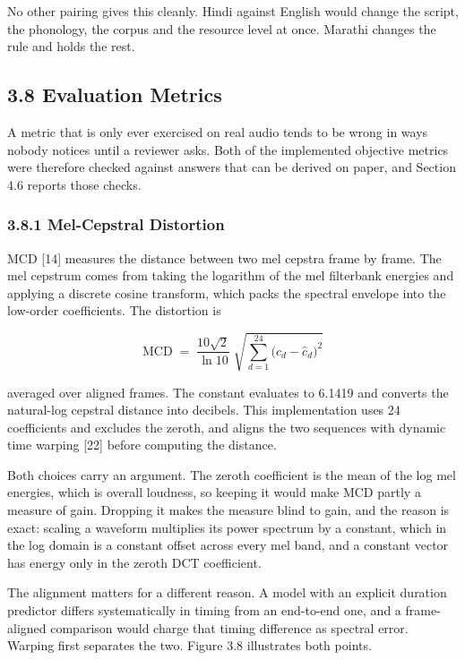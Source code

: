 \documentclass[12pt,a4paper]{article}
\begin{document}
No other pairing gives this cleanly. Hindi against English would change the script, the phonology, the corpus and the resource level at once. Marathi changes the rule and holds the rest.

\subsection*{3.8  Evaluation Metrics}
A metric that is only ever exercised on real audio tends to be wrong in ways nobody notices until a reviewer asks. Both of the implemented objective metrics were therefore checked against answers that can be derived on paper, and Section 4.6 reports those checks.

\subsubsection*{3.8.1  Mel-Cepstral Distortion}
MCD [14] measures the distance between two mel cepstra frame by frame. The mel cepstrum comes from taking the logarithm of the mel filterbank energies and applying a discrete cosine transform, which packs the spectral envelope into the low-order coefficients. The distortion is

\begin{equation*}
  \mathrm{MCD} \;=\; \frac{10\sqrt{2}}{\ln 10}\;
  \sqrt{\sum_{d=1}^{24}\bigl(c_d-\hat{c}_d\bigr)^{2}}
\end{equation*}

averaged over aligned frames. The constant evaluates to 6.1419 and converts the natural-log cepstral distance into decibels. This implementation uses 24 coefficients and excludes the zeroth, and aligns the two sequences with dynamic time warping [22] before computing the distance.

Both choices carry an argument. The zeroth coefficient is the mean of the log mel energies, which is overall loudness, so keeping it would make MCD partly a measure of gain. Dropping it makes the measure blind to gain, and the reason is exact: scaling a waveform multiplies its power spectrum by a constant, which in the log domain is a constant offset across every mel band, and a constant vector has energy only in the zeroth DCT coefficient.

The alignment matters for a different reason. A model with an explicit duration predictor differs systematically in timing from an end-to-end one, and a frame-aligned comparison would charge that timing difference as spectral error. Warping first separates the two. Figure 3.8 illustrates both points.
\end{document}

